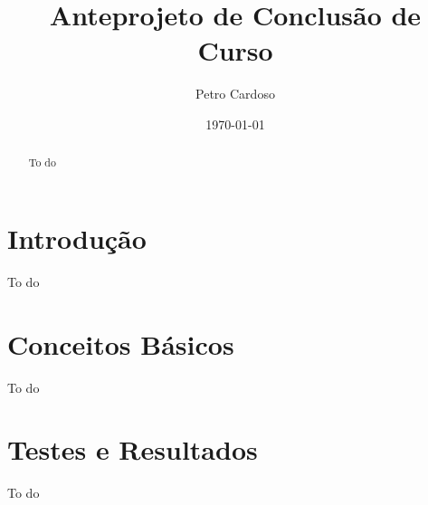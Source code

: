 \documentclass[12pt, a4paper]{article}
\begin{document}
\title{Anteprojeto de Conclusão de Curso}
\author{Petro Cardoso}
\date{\today}



\begin{abstract} 
    To do
\end{abstract}
\newpage

\listoffigures
\newpage

\listoftables
\newpage

\tableofcontents
\newpage

\section{Introdução}
To do

\section{Conceitos Básicos}
To do

\newpage


\newpage


\section{Testes e Resultados}
To do

\newpage
\nocite{*}


\end{document}
